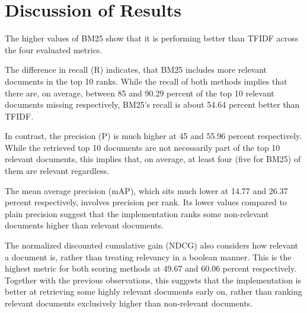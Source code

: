 \section{Discussion of Results}
\label{sec:discussion}

The higher values of BM25 show that it is performing better than TFIDF across the four evaluated metrics.

The difference in recall (R) indicates, that BM25 includes more relevant documents in the top 10 ranks.
While the recall of both methods implies that there are, on average, between 85 and 90.29 percent of the top 10 relevant documents missing respectively, BM25's recall is about 54.64 percent better than TFIDF.

In contrast, the precision (P) is much higher at 45 and 55.96 percent respectively.
While the retrieved top 10 documents are not necessarily part of the top 10 relevant documents, this implies that, on average, at least four (five for BM25) of them are relevant regardless.

The mean average precision (mAP), which sits much lower at 14.77 and 26.37 percent respectively, involves precision per rank.
Its lower values compared to plain precision suggest that the implementation ranks some non-relevant documents higher than relevant documents.

The normalized discounted cumulative gain (NDCG) also considers how relevant a document is, rather than treating relevancy in a boolean manner.
This is the highest metric for both scoring methods at 49.67 and 60.06 percent respectively.
Together with the previous observations, this suggests that the implementation is better at retrieving some highly relevant documents early on, rather than ranking relevant documents exclusively higher than non-relevant documents.
